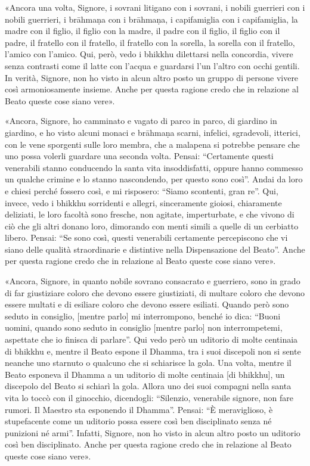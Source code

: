 «Ancora una volta, Signore, i sovrani litigano con i sovrani, i nobili guerrieri
con i nobili guerrieri, i brāhmaṇa con i brāhmaṇa, i capifamiglia con i
capifamiglia, la madre con il figlio, il figlio con la madre, il padre con il
figlio, il figlio con il padre, il fratello con il fratello, il fratello con la
sorella, la sorella con il fratello, l’amico con l’amico. Qui, però, vedo i
bhikkhu dilettarsi nella concordia, vivere senza contrasti come il latte con
l’acqua e guardarsi l’un l’altro con occhi gentili. In verità, Signore, non ho
visto in alcun altro posto un gruppo di persone vivere così armoniosamente
insieme. Anche per questa ragione credo che in relazione al Beato queste cose
siano vere».

«Ancora, Signore, ho camminato e vagato di parco in parco, di giardino in
giardino, e ho visto alcuni monaci e brāhmaṇa scarni, infelici, sgradevoli,
itterici, con le vene sporgenti sulle loro membra, che a malapena si potrebbe
pensare che uno possa volerli guardare una seconda volta. Pensai: “Certamente
questi venerabili stanno conducendo la santa vita insoddisfatti, oppure hanno
commesso un qualche crimine e lo stanno nascondendo, per questo sono così”.
Andai da loro e chiesi perché fossero così, e mi risposero: “Siamo scontenti,
gran re”. Qui, invece, vedo i bhikkhu sorridenti e allegri, sinceramente
gioiosi, chiaramente deliziati, le loro facoltà sono fresche, non agitate,
imperturbate, e che vivono di ciò che gli altri donano loro, dimorando con menti
simili a quelle di un cerbiatto libero. Pensai: “Se sono così, questi venerabili
certamente percepiscono che vi siano delle qualità straordinarie e distintive
nella Dispensazione del Beato”. Anche per questa ragione credo che in relazione
al Beato queste cose siano vere».

«Ancora, Signore, in quanto nobile sovrano consacrato e guerriero, sono in grado
di far giustiziare coloro che devono essere giustiziati, di multare coloro che
devono essere multati e di esiliare coloro che devono essere esiliati. Quando
però sono seduto in consiglio, [mentre parlo] mi interrompono, benché io dica:
“Buoni uomini, quando sono seduto in consiglio [mentre parlo] non
interrompetemi, aspettate che io finisca di parlare”. Qui vedo però un uditorio
di molte centinaia di bhikkhu e, mentre il Beato espone il Dhamma, tra i suoi
discepoli non si sente neanche uno starnuto o qualcuno che si schiarisce la
gola. Una volta, mentre il Beato esponeva il Dhamma a un uditorio di molte
centinaia [di bhikkhu], un discepolo del Beato si schiarì la gola. Allora uno
dei suoi compagni nella santa vita lo toccò con il ginocchio, dicendogli:
“Silenzio, venerabile signore, non fare rumori. Il Maestro sta esponendo il
Dhamma”. Pensai: “È meraviglioso, è stupefacente come un uditorio possa essere
così ben disciplinato senza né punizioni né armi”. Infatti, Signore, non ho
visto in alcun altro posto un uditorio così ben disciplinato. Anche per questa
ragione credo che in relazione al Beato queste cose siano vere».

